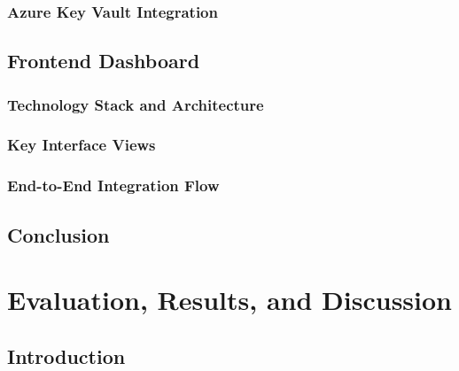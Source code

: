 \documentclass[12pt,a4paper]{report}
\begin{document}
  \subsection{Azure Key Vault Integration}
  \label{subsec:keyvault}

\section{Frontend Dashboard}
\label{sec:frontend-deployment}

  \subsection{Technology Stack and Architecture}
  \label{subsec:frontend-stack}

  \subsection{Key Interface Views}
  \label{subsec:workspace-ui}

  \subsection{End-to-End Integration Flow}
  \label{subsec:e2e-integration}

\section{Conclusion}
\label{sec:ch6-conclusion}


\chapter{Evaluation, Results, and Discussion}
\label{ch:evaluation}

\section{Introduction}
\label{sec:ch7-intro}
\end{document}
